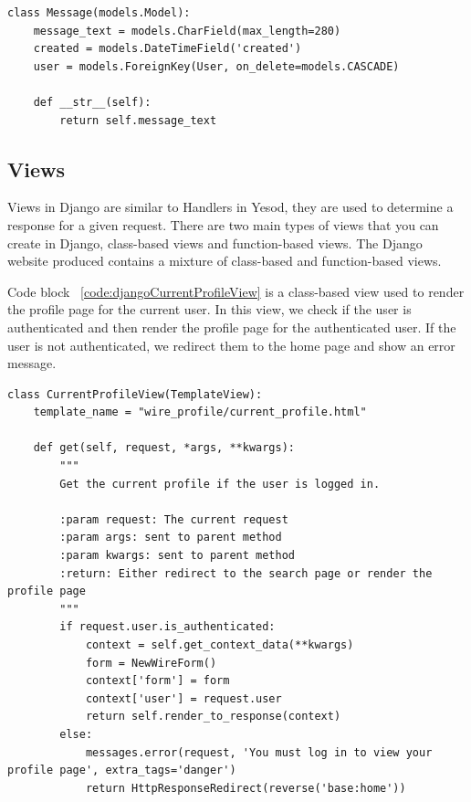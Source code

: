 \begin{lstlisting}[caption={The user entity in Django},label={code:djangoEntities}]
    class Message(models.Model):
    message_text = models.CharField(max_length=280)
    created = models.DateTimeField('created')
    user = models.ForeignKey(User, on_delete=models.CASCADE)

    def __str__(self):
        return self.message_text
\end{lstlisting}

\subsection{Views}

Views in Django are similar to Handlers in Yesod, they are used to determine
a response for a given request. There are two main types of views that you can
create in Django, class-based views and function-based views. The Django website
produced contains a mixture of class-based and function-based views.

Code block ~\ref{code:djangoCurrentProfileView} is a class-based view used to
render the profile page for the current user. In this view, we check if the
user is authenticated and then render the profile page for the authenticated
user. If the user is not authenticated, we redirect them to the home page and
show an error message.

\begin{lstlisting}[caption={Class-based current profile view},label={code:djangoCurrentProfileView}]
    class CurrentProfileView(TemplateView):
    template_name = "wire_profile/current_profile.html"

    def get(self, request, *args, **kwargs):
        """
        Get the current profile if the user is logged in.

        :param request: The current request
        :param args: sent to parent method
        :param kwargs: sent to parent method
        :return: Either redirect to the search page or render the profile page
        """
        if request.user.is_authenticated:
            context = self.get_context_data(**kwargs)
            form = NewWireForm()
            context['form'] = form
            context['user'] = request.user
            return self.render_to_response(context)
        else:
            messages.error(request, 'You must log in to view your profile page', extra_tags='danger')
            return HttpResponseRedirect(reverse('base:home'))
\end{lstlisting}


